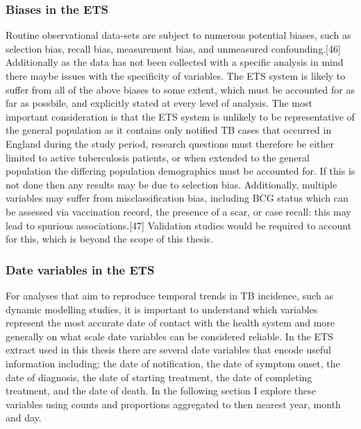 \documentclass[11pt,twoside]{bristolthesis}
\begin{document}
  \hypertarget{biases-in-the-ets}{%
  \subsubsection{Biases in the ETS}\label{biases-in-the-ets}}
  
  Routine observational data-sets are subject to numerous potential biases, such as selection bias, recall bias, measurement bias, and unmeasured confounding.{[}46{]} Additionally as the data has not been collected with a specific analysis in mind there maybe issues with the specificity of variables. The ETS system is likely to suffer from all of the above biases to some extent, which must be accounted for as far as possbile, and explicitly stated at every level of analysis. The most important consideration is that the ETS system is unlikely to be representative of the general population as it contains only notified TB cases that occurred in England during the study period, research questions must therefore be either limited to active tuberculosis patients, or when extended to the general population the differing population demographics must be accounted for. If this is not done then any results may be due to selection bias. Additionally, multiple variables may suffer from misclassification bias, including BCG status which can be assessed via vaccination record, the presence of a scar, or case recall: this may lead to spurious associations.{[}47{]} Validation studies would be required to account for this, which is beyond the scope of this thesis.
  
  \hypertarget{date-variables-in-the-ets}{%
  \subsubsection{Date variables in the ETS}\label{date-variables-in-the-ets}}
  
  For analyses that aim to reproduce temporal trends in TB incidence, such as dynamic modelling studies, it is important to understand which variables represent the most accurate date of contact with the health system and more generally on what scale date variables can be considered reliable. In the ETS extract used in this thesis there are several date variables that encode useful information including; the date of notification, the date of symptom onset, the date of diagnosis, the date of starting treatment, the date of completing treatment, and the date of death. In the following section I explore these variables using counts and proportions aggregated to then nearest year, month and day.
  
\end{document}
